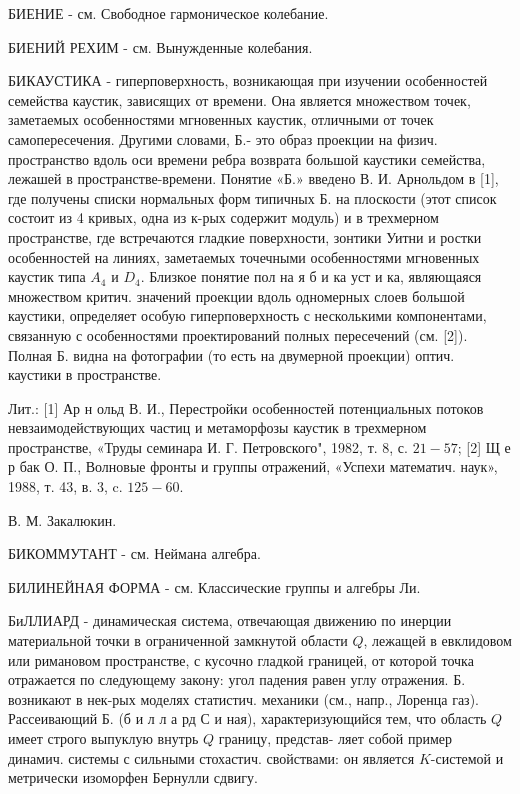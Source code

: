 \documentclass[10pt]{article}
\begin{document}
БИЕНИЕ - см. Свободное гармоническое колебание.



БИЕНИЙ РЕХИМ - см. Вынужденные колебания.



БИКАУСТИКА - гиперповерхность, возникающая при изучении особенностей семейства каустик, зависящих от времени. Она является множеством точек, заметаемых особенностями мгновенных каустик, отличными от точек самопересечения. Другими словами, Б.- это образ проекции на физич. пространство вдоль оси времени ребра возврата большой каустики семейства, лежашей в пространстве-времени. Понятие «Б.» введено В. И. Арнольдом в [1], где получены списки нормальных форм типичных Б. на плоскости (этот список состоит из 4 кривых, одна из к-рых содержит модуль) и в трехмерном пространстве, где встречаются гладкие поверхности, зонтики Уитни и ростки особенностей на линиях, заметаемых точечными особенностями мгновенных каустик типа $A_{4}$ и $D_{4}$. Близкое понятие пол на я б и ка уст и ка, являющаяся множеством критич. значений проекции вдоль одномерных слоев большой каустики, определяет особую гиперповерхность с несколькими компонентами, связанную с особенностями проектирований полных пересечений (см. [2]). Полная Б. видна на фотографии (то есть на двумерной проекции) оптич. каустики в пространстве.



Лит.: [1] Ар н ольд В. И., Перестройки особенностей потенциальных потоков невзаимодействующих частиц и метаморфозы каустик в трехмерном пространстве, «Труды семинара И. Г. Петровского", 1982, т. 8, с. $21-57$; [2] Щ е р бак О. П., Волновые фронты и группы отражений, «Успехи математич. наук», 1988, т. 43, в. 3, c. $125-60$.



В. М. Закалюкин.



БИКОММУТАНТ - см. Неймана алгебра.



БИЛИНЕЙНАЯ ФОРМА - см. Классические группы и алгебры Ли.



БиЛЛИАРД - динамическая система, отвечающая движению по инерции материальной точки в ограниченной замкнутой области $Q$, лежащей в евклидовом или римановом пространстве, с кусочно гладкой границей, от которой точка отражается по следующему закону: угол падения равен углу отражения. Б. возникают в нек-рых моделях статистич. механики (см., напр., Лоренца газ). Рассеивающий Б. (б и л л а рд С и ная), характеризующийся тем, что область $Q$ имеет строго выпуклую внутрь $Q$ границу, представ- ляет собой пример динамич. системы с сильными стохастич. свойствами: он является $K$-системой и метрически изоморфен Бернулли сдвигу.
\end{document}
